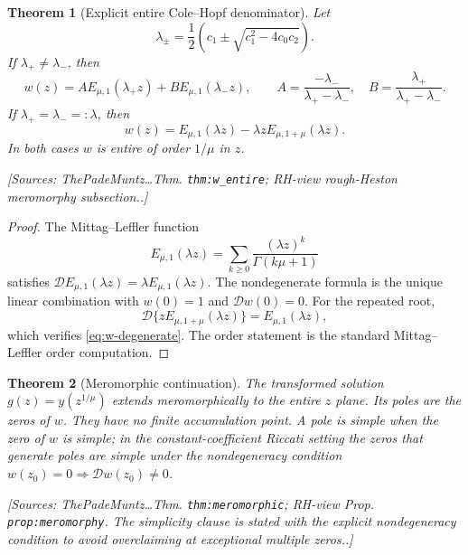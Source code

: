 \documentclass[11pt]{article}
\newtheorem{theorem}{Theorem}[section]
\theoremstyle{definition}
\newcommand{\ML}[2]{E_{#1,#2}}
\newcommand{\Dc}{\mathcal{D}}
\newcommand{\Source}[1]{\par\smallskip\noindent\textup{[Sources: #1.]}}
\begin{document}
\begin{theorem}[Explicit entire Cole--Hopf denominator]\label{thm:cole-hopf-explicit}
Let
\begin{equation}\label{eq:lambdas}
        \lambda_{\pm}=\frac12\left(c_1\pm\sqrt{c_1^2-4c_0c_2}\right).
\end{equation}
If $\lambda_+\ne\lambda_-$, then
\begin{equation}\label{eq:w-explicit}
        w(z)=A\ML{\mu}{1}(\lambda_+z)+B\ML{\mu}{1}(\lambda_-z),
        \qquad
        A=\frac{-\lambda_-}{\lambda_+-\lambda_-},
        \quad
        B=\frac{\lambda_+}{\lambda_+-\lambda_-}.
\end{equation}
If $\lambda_+=\lambda_-=:\lambda$, then
\begin{equation}\label{eq:w-degenerate}
        w(z)=\ML{\mu}{1}(\lambda z)-\lambda z\ML{\mu}{1+\mu}(\lambda z).
\end{equation}
In both cases $w$ is entire of order $1/\mu$ in $z$.
\Source{ThePadeMuntz\ldots Thm. \texttt{thm:w\_entire}; RH-view rough-Heston meromorphy subsection.}
\end{theorem}

\begin{proof}
The Mittag--Leffler function
\[
        \ML{\mu}{1}(\lambda z)=\sum_{k\ge0}\frac{(\lambda z)^k}{\Gamma(k\mu+1)}
\]
satisfies $\Dc\ML{\mu}{1}(\lambda z)=\lambda\ML{\mu}{1}(\lambda z)$.
The nondegenerate formula is the unique linear combination with $w(0)=1$ and $\Dc w(0)=0$.
For the repeated root,
\[
        \Dc\{z\ML{\mu}{1+\mu}(\lambda z)\}=\ML{\mu}{1}(\lambda z),
\]
which verifies \eqref{eq:w-degenerate}.
The order statement is the standard Mittag--Leffler order computation.
\end{proof}

\begin{theorem}[Meromorphic continuation]\label{thm:meromorphy}
The transformed solution $g(z)=y(z^{1/\mu})$ extends meromorphically to the entire $z$ plane.
Its poles are the zeros of $w$.
They have no finite accumulation point.
A pole is simple when the zero of $w$ is simple;
in the constant-coefficient Riccati setting the zeros that generate poles are simple under the nondegeneracy condition
$w(z_0)=0\Rightarrow \Dc w(z_0)\ne0$.
\Source{ThePadeMuntz\ldots Thm. \texttt{thm:meromorphic}; RH-view Prop. \texttt{prop:meromorphy}. The simplicity clause is stated with the explicit nondegeneracy condition to avoid overclaiming at exceptional multiple zeros.}
\end{theorem}
\end{document}
